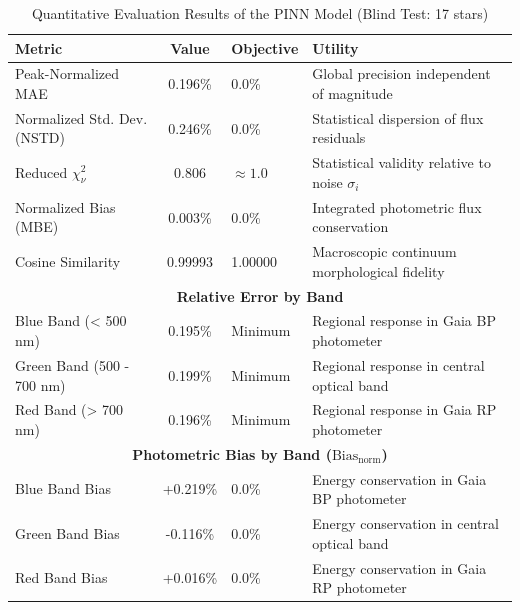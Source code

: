 
\begin{table}[htpb]
\centering
\caption{Quantitative Evaluation Results of the PINN Model (Blind Test: 17 stars)}
\label{tab:pinn_evaluation}
\begin{tabular}{lcll}
\hline
\textbf{Metric} & \textbf{Value} & \textbf{Objective} & \textbf{Utility} \\
\hline
Peak-Normalized MAE & 0.196\% & 0.0\% & Global precision independent of magnitude \\
Normalized Std. Dev. (NSTD) & 0.246\% & 0.0\% & Statistical dispersion of flux residuals \\
Reduced $\chi^2_\nu$ & 0.806 & $\approx 1.0$ & Statistical validity relative to noise $\sigma_i$ \\
Normalized Bias (MBE) & 0.003\% & 0.0\% & Integrated photometric flux conservation \\
Cosine Similarity & 0.99993 & 1.00000 & Macroscopic continuum morphological fidelity \\
\hline
\multicolumn{4}{c}{\textbf{Relative Error by Band}} \\
\hline
Blue Band (< 500 nm) & 0.195\% & Minimum & Regional response in Gaia BP photometer \\
Green Band (500 - 700 nm) & 0.199\% & Minimum & Regional response in central optical band \\
Red Band (> 700 nm) & 0.196\% & Minimum & Regional response in Gaia RP photometer \\
\hline
\multicolumn{4}{c}{\textbf{Photometric Bias by Band ($\text{Bias}_{\text{norm}}$)}} \\
\hline
Blue Band Bias & +0.219\% & 0.0\% & Energy conservation in Gaia BP photometer \\
Green Band Bias & -0.116\% & 0.0\% & Energy conservation in central optical band \\
Red Band Bias & +0.016\% & 0.0\% & Energy conservation in Gaia RP photometer \\
\hline
\end{tabular}
\end{table}
